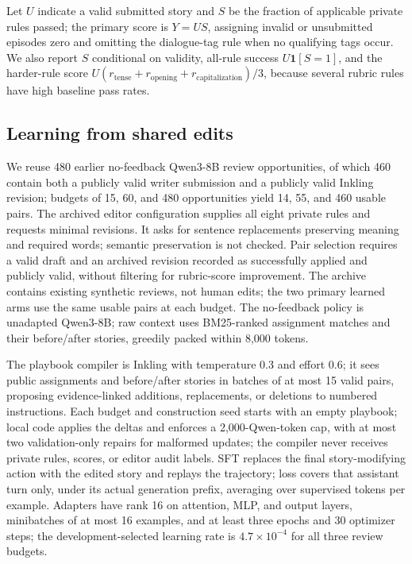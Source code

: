 \documentclass[10pt,twocolumn,letterpaper]{article}
\newcommand{\claim}[2]{#2}
\begin{document}
\claim{C35}{Let $U$ indicate a valid submitted story and $S$ be the fraction of applicable private rules passed; the primary score is $Y=US$, assigning invalid or unsubmitted episodes zero and omitting the dialogue-tag rule when no qualifying tags occur.}
\claim{C36}{We also report $S$ conditional on validity, all-rule success $U\mathbf{1}[S=1]$, and the harder-rule score $U(r_{\mathrm{tense}}+r_{\mathrm{opening}}+r_{\mathrm{capitalization}})/3$, because several rubric rules have high baseline pass rates.}

\subsection{Learning from shared edits}
\claim{C30}{We reuse 480 earlier no-feedback Qwen3-8B review opportunities, of which 460 contain both a publicly valid writer submission and a publicly valid Inkling revision; budgets of 15, 60, and 480 opportunities yield 14, 55, and 460 usable pairs.}
\claim{C55}{The archived editor configuration supplies all eight private rules and requests minimal revisions. It asks for sentence replacements preserving meaning and required words; semantic preservation is not checked. Pair selection requires a valid draft and an archived revision recorded as successfully applied and publicly valid, without filtering for rubric-score improvement.}
\claim{C31}{The archive contains existing synthetic reviews, not human edits; the two primary learned arms use the same usable pairs at each budget.}
\claim{C41}{The no-feedback policy is unadapted Qwen3-8B; raw context uses BM25-ranked assignment matches and their before/after stories, greedily packed within 8,000 tokens.}

\claim{C42}{The playbook compiler is Inkling with temperature 0.3 and effort 0.6; it sees public assignments and before/after stories in batches of at most 15 valid pairs, proposing evidence-linked additions, replacements, or deletions to numbered instructions.}
\claim{C43}{Each budget and construction seed starts with an empty playbook; local code applies the deltas and enforces a 2,000-Qwen-token cap, with at most two validation-only repairs for malformed updates; the compiler never receives private rules, scores, or editor audit labels.}
\claim{C44}{SFT replaces the final story-modifying action with the edited story and replays the trajectory; loss covers that assistant turn only, under its actual generation prefix, averaging over supervised tokens per example.}
\claim{C45}{Adapters have rank 16 on attention, MLP, and output layers, minibatches of at most 16 examples, and at least three epochs and 30 optimizer steps; the development-selected learning rate is $4.7\times10^{-4}$ for all three review budgets.}
\end{document}
